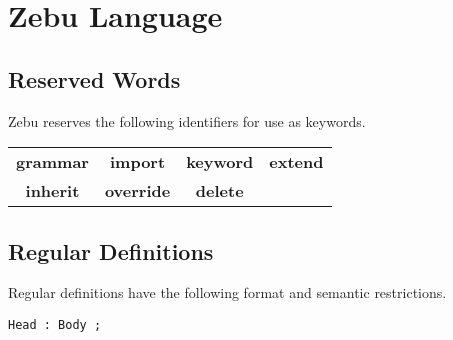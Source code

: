 \documentclass[12pt]{article}
\begin{document}
\section{Zebu Language}

\subsection{Reserved Words}
Zebu reserves the following identifiers for use as keywords.

\begin{center}
\begin{tabular}{c c c c}
\textbf{grammar} & \textbf{import} & \textbf{keyword} & \textbf{extend}   \\
\textbf{inherit} & \textbf{override} & \textbf{delete}                    \\
\end{tabular}
\end{center}

\subsection{Regular Definitions}

Regular definitions have the following format and semantic restrictions.

\begin{verbatim}
Head : Body ;
\end{verbatim}
\end{document}
